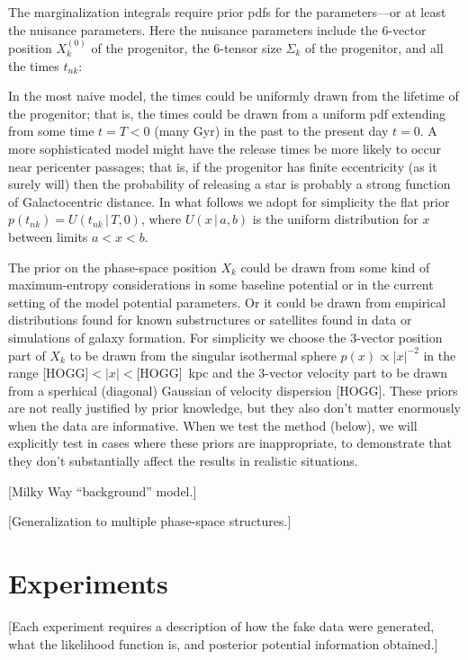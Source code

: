 \documentclass[letterpaper,12pt,preprint]{aastex}
\newcommand{\given}{\,|\,}
\begin{document}
The marginalization integrals require prior pdfs for the
parameters---or at least the nuisance parameters.  Here the nuisance
parameters include the 6-vector position $X_k^{(0)}$ of the
progenitor, the 6-tensor size $\Sigma_k$ of the progenitor, and all
the times $t_{nk}$:

In the most naive model, the times could be uniformly drawn from the
lifetime of the progenitor; that is, the times could be drawn from a
uniform pdf extending from some time $t=T<0$ (many Gyr) in the past to
the present day $t=0$.  A more sophisticated model might have the
release times be more likely to occur near pericenter passages; that
is, if the progenitor has finite eccentricity (as it surely will) then
the probability of releasing a star is probably a strong function of
Galactocentric distance.  In what follows we adopt for simplicity the
flat prior $p(t_{nk})=U(t_{nk}\given T,0)$, where $U(x\given a,b)$ is
the uniform distribution for $x$ between limits $a<x<b$.

The prior on the phase-space position $X_k$ could be drawn from some
kind of maximum-entropy considerations in some baseline potential or
in the current setting of the model potential parameters.  Or it could
be drawn from empirical distributions found for known substructures or
satellites found in data or simulations of galaxy formation.  For
simplicity we choose the 3-vector position part of $X_k$ to be drawn
from the singular isothermal sphere $p(x)\propto |x|^{-2}$ in the
range [HOGG]$<|x|<$[HOGG]~kpc and the 3-vector velocity part to be
drawn from a sperhical (diagonal) Gaussian of velocity dispersion
[HOGG].  These priors are not really justified by prior knowledge, but
they also don't matter enormously when the data are informative.  When
we test the method (below), we will explicitly test in cases where
these priors are inappropriate, to demonstrate that they don't
substantially affect the results in realistic situations.

[Milky Way ``background'' model.]

[Generalization to multiple phase-space structures.]

\section{Experiments}

[Each experiment requires a description of how the fake data were
  generated, what the likelihood function is, and posterior potential
  information obtained.]
\end{document}
